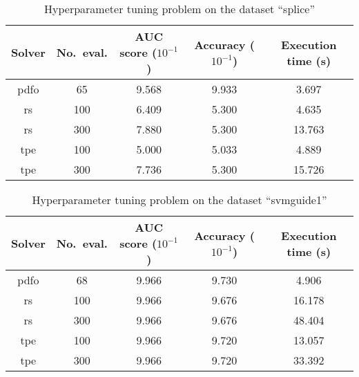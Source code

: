 \begin{table}[!ht]
    \caption{Hyperparameter tuning problem on the dataset \enquote{splice}}
    \label{tab:splice}
    \centering
    \begin{tabular}{cS[table-parse-only]SSS}
        \toprule
        Solver      & {No.\ eval.}  & {AUC score ($10^{-1}$)}   & {Accuracy ($10^{-1}$)}    & {Execution time (\si{\second})}\\
        \midrule
        \gls{pdfo}  & 65            & 9.568                     & 9.933                     & 3.697\\
        \gls{rs}    & 100           & 6.409                     & 5.300                     & 4.635\\
        \gls{rs}    & 300           & 7.880                     & 5.300                     & 13.763\\
        \gls{tpe}   & 100           & 5.000                     & 5.033                     & 4.889\\
        \gls{tpe}   & 300           & 7.736                     & 5.300                     & 15.726\\
        \bottomrule
    \end{tabular}
\end{table}

\begin{table}[!ht]
    \caption{Hyperparameter tuning problem on the dataset \enquote{svmguide1}}
    \label{tab:svmguide1}
    \centering
    \begin{tabular}{cS[table-parse-only]SSS}
        \toprule
        Solver      & {No.\ eval.}  & {AUC score ($10^{-1}$)}   & {Accuracy ($10^{-1}$)}    & {Execution time (\si{\second})}\\
        \midrule
        \gls{pdfo}  & 68            & 9.966                     & 9.730                     & 4.906\\
        \gls{rs}    & 100           & 9.966                     & 9.676                     & 16.178\\
        \gls{rs}    & 300           & 9.966                     & 9.676                     & 48.404\\
        \gls{tpe}   & 100           & 9.966                     & 9.720                     & 13.057\\
        \gls{tpe}   & 300           & 9.966                     & 9.720                     & 33.392\\
        \bottomrule
    \end{tabular}
\end{table}

